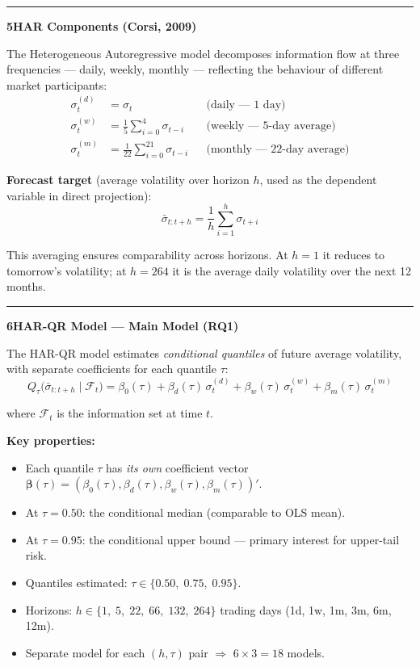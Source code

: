 \documentclass[10pt,a4paper]{article}
\newcommand{\sectionrule}{\vspace{0.3em}\hrule\vspace{0.5em}}
\begin{document}
\sectionrule

\textbf{5\quad HAR Components (Corsi, 2009)}

The Heterogeneous Autoregressive model decomposes information flow at
three frequencies --- daily, weekly, monthly --- reflecting the behaviour
of different market participants:
\begin{align*}
\sigma_t^{(d)} &= \sigma_t
& &\text{(daily --- 1 day)} \\[4pt]
\sigma_t^{(w)} &= \frac{1}{5}\sum_{i=0}^{4}\sigma_{t-i}
& &\text{(weekly --- 5-day average)} \\[4pt]
\sigma_t^{(m)} &= \frac{1}{22}\sum_{i=0}^{21}\sigma_{t-i}
& &\text{(monthly --- 22-day average)}
\end{align*}

\textbf{Forecast target} (average volatility over horizon $h$, used as
the dependent variable in direct projection):
\begin{equation*}
\bar{\sigma}_{t:t+h} = \frac{1}{h}\sum_{i=1}^{h}\sigma_{t+i}
\end{equation*}

This averaging ensures comparability across horizons. At $h=1$ it reduces
to tomorrow's volatility; at $h=264$ it is the average daily volatility
over the next 12 months.

\sectionrule

\textbf{6\quad HAR-QR Model --- Main Model (RQ1)}

The HAR-QR model estimates \emph{conditional quantiles} of future average
volatility, with separate coefficients for each quantile $\tau$:
\begin{equation*}
\boxed{\;
Q_{\tau}\!\bigl(\bar{\sigma}_{t:t+h}\mid\mathcal{F}_t\bigr)
= \beta_0(\tau) + \beta_d(\tau)\,\sigma_t^{(d)} + \beta_w(\tau)\,\sigma_t^{(w)} + \beta_m(\tau)\,\sigma_t^{(m)}
\;}
\end{equation*}

where $\mathcal{F}_t$ is the information set at time $t$.

\textbf{Key properties:}
\begin{itemize}
\item Each quantile $\tau$ has \emph{its own} coefficient vector
  $\bm{\beta}(\tau) = (\beta_0(\tau), \beta_d(\tau), \beta_w(\tau), \beta_m(\tau))'$.
\item At $\tau = 0.50$: the conditional median (comparable to OLS mean).
\item At $\tau = 0.95$: the conditional upper bound --- primary interest for
  upper-tail risk.
\item Quantiles estimated: $\tau \in \{0.50,\; 0.75,\; 0.95\}$.
\item Horizons: $h \in \{1,\; 5,\; 22,\; 66,\; 132,\; 264\}$ trading days
  (1d, 1w, 1m, 3m, 6m, 12m).
\item Separate model for each $(h, \tau)$ pair $\Rightarrow$ $6 \times 3 = 18$ models.
\end{itemize}
\end{document}
